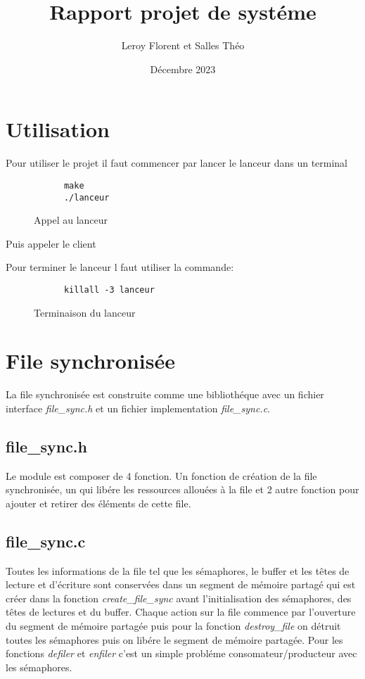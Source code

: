 \documentclass[12pt]{article}
\title{Rapport projet de systéme}
\author{Leroy Florent et Salles Théo}
\date{Décembre 2023}
\begin{document}
\maketitle
\tableofcontents
\newpage
\section{Utilisation}
Pour utiliser le projet il faut commencer par lancer le lanceur dans un
terminal
\begin{figure}[H]
  \centering
  \begin{verbatim}
      make
      ./lanceur
  \end{verbatim}
  \caption{Appel au lanceur}
\end{figure}
Puis appeler le client

Pour terminer le lanceur l faut utiliser la commande:
\begin{figure}[H]
  \centering
  \begin{verbatim}
      killall -3 lanceur
  \end{verbatim}
  \caption{Terminaison du lanceur}
\end{figure}
\section{File synchronisée}
La file synchronisée est construite comme une bibliothéque avec un fichier
interface \textit{file\_sync.h} et un fichier implementation
\textit{file\_sync.c}.
\subsection{file\_sync.h}
Le module est composer de 4 fonction. Un fonction de création de la file
synchronisée, un qui libére les ressources allouées à la file et 2 autre
fonction pour ajouter
et retirer des éléments de cette file.
\subsection{file\_sync.c}
Toutes les informations de la file tel que les sémaphores, le buffer et les
têtes de lecture
et d'écriture sont conservées dans un segment de mémoire partagé qui est créer
dans la fonction \textit{create\_file\_sync} avant l'initialisation des
sémaphores,
des têtes de lectures et du buffer.
Chaque action sur la file commence par l'ouverture du segment de mémoire
partagée
puis pour la fonction \textit{destroy\_file} on détruit toutes les sémaphores
puis on libére le segment de mémoire partagée. Pour les fonctions
\textit{defiler} et \textit{enfiler}
c'est un simple probléme consomateur/producteur avec les sémaphores.
\end{document}

